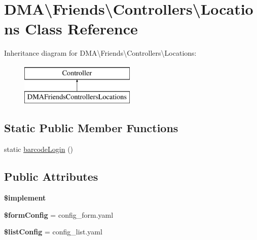 \hypertarget{classDMA_1_1Friends_1_1Controllers_1_1Locations}{}\section{D\+M\+A\textbackslash{}Friends\textbackslash{}Controllers\textbackslash{}Locations Class Reference}
\label{classDMA_1_1Friends_1_1Controllers_1_1Locations}
Inheritance diagram for D\+M\+A\textbackslash{}Friends\textbackslash{}Controllers\textbackslash{}Locations\+:\begin{figure}[H]
\begin{center}
\leavevmode
\includegraphics[height=2.000000cm]{d2/d9c/classDMA_1_1Friends_1_1Controllers_1_1Locations}
\end{center}
\end{figure}
\subsection*{Static Public Member Functions}
\begin{DoxyCompactItemize}
\item 
static \hyperlink{classDMA_1_1Friends_1_1Controllers_1_1Locations_a9b6fce6b3f0cf4fe6671fe110b0c8791}{barcode\+Login} ()
\end{DoxyCompactItemize}
\subsection*{Public Attributes}
\begin{DoxyCompactItemize}
\item 
{\bfseries \$implement}
\item 
\hypertarget{classDMA_1_1Friends_1_1Controllers_1_1Locations_a8a769617e49a5e862fa8633b75467223}{}{\bfseries \$form\+Config} = \textquotesingle{}config\+\_\+form.\+yaml\textquotesingle{}\label{classDMA_1_1Friends_1_1Controllers_1_1Locations_a8a769617e49a5e862fa8633b75467223}

\item 
\hypertarget{classDMA_1_1Friends_1_1Controllers_1_1Locations_a54b41dd09d63dafca0bff7528a8c27e1}{}{\bfseries \$list\+Config} = \textquotesingle{}config\+\_\+list.\+yaml\textquotesingle{}\label{classDMA_1_1Friends_1_1Controllers_1_1Locations_a54b41dd09d63dafca0bff7528a8c27e1}

\end{DoxyCompactItemize}


